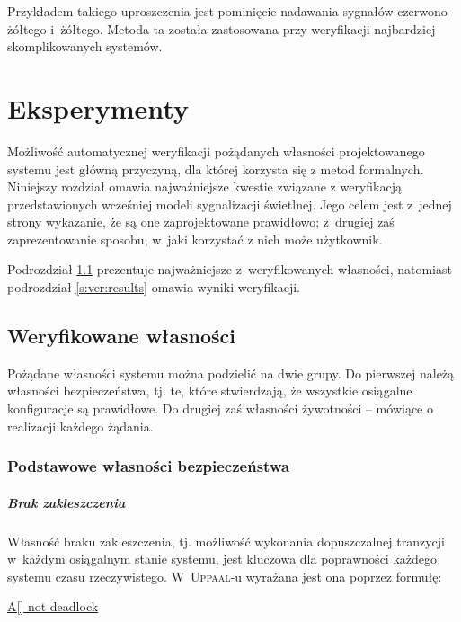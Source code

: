 \documentclass{pracamgr}
\newcommand{\upp}{\textsc{Uppaal}}
\theoremstyle{plain}
\begin{document}
Przykładem takiego uproszczenia jest pominięcie nadawania sygnałów
czerwono-żółtego i~żółtego. Metoda ta została zastosowana przy
weryfikacji najbardziej skomplikowanych systemów.

\chapter{Eksperymenty}
\label{c:ver}
Możliwość automatycznej weryfikacji pożądanych własności
projektowanego systemu jest główną przyczyną, dla której korzysta się
z metod formalnych. Niniejszy rozdział omawia najważniejsze kwestie
związane z weryfikacją przedstawionych wcześniej modeli sygnalizacji
świetlnej. Jego celem jest z~jednej strony wykazanie, że są one
zaprojektowane prawidłowo; z~drugiej zaś zaprezentowanie sposobu,
w~jaki korzystać z nich może użytkownik.

Podrozdział \ref{s:ver:properties} prezentuje najważniejsze
z~weryfikowanych własności, natomiast podrozdział \ref{s:ver:results}
omawia wyniki weryfikacji.

\section{Weryfikowane własności}
\label{s:ver:properties}

Pożądane własności systemu można podzielić na dwie grupy. Do pierwszej
należą własności bezpieczeństwa, tj. te, które stwierdzają, że
wszystkie osiągalne konfiguracje są prawidłowe. Do drugiej zaś
własności żywotności -- mówiące o realizacji każdego żądania.

\subsection{Podstawowe własności bezpieczeństwa}
\label{s:ver:properties:safety}

\paragraph{Brak zakleszczenia} Własność braku zakleszczenia,
tj. możliwość wykonania dopuszczalnej tranzycji w~każdym osiągalnym
stanie systemu, jest kluczowa dla poprawności każdego systemu czasu
rzeczywistego. W~\upp-u wyrażana jest ona poprzez formułę:
\begin{center}
  \url{A[] not deadlock}
\end{center}
\end{document}
